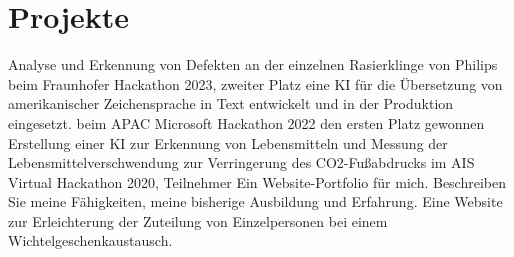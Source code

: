 \section{Projekte}
\resumeSubHeadingListStart
{}
{Analyse und Erkennung von Defekten an der einzelnen Rasierklinge von Philips beim Fraunhofer Hackathon 2023, zweiter Platz}
{eine KI für die Übersetzung von amerikanischer Zeichensprache in Text entwickelt und in der Produktion eingesetzt. beim APAC Microsoft Hackathon 2022 den ersten Platz gewonnen}
{Erstellung einer KI zur Erkennung von Lebensmitteln und Messung der Lebensmittelverschwendung zur Verringerung des CO2-Fußabdrucks im AIS Virtual Hackathon 2020, Teilnehmer}
{Ein Website-Portfolio für mich. Beschreiben Sie meine Fähigkeiten, meine bisherige Ausbildung und Erfahrung.}
{Eine Website zur Erleichterung der Zuteilung von Einzelpersonen bei einem Wichtelgeschenkaustausch.}
\resumeSubHeadingListEnd


